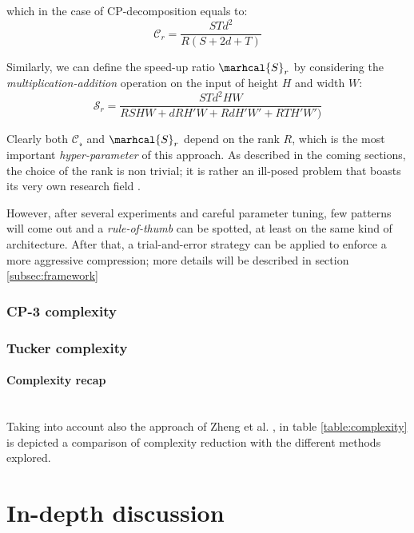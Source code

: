 which in the case of CP-decomposition equals to: 
\begin{equation}
    \mathcal{C}_r = \frac{STd^2}{R(S+2d+T)}    
\end{equation}

Similarly, we can define the speed-up ratio $\marhcal{S}_r$ by considering the \emph{multiplication-addition} operation on the input of height $H$ and width $W$: 
\begin{equation}
    \mathcal{S}_r = \frac{STd^2HW}{RSHW + dRH'W + RdH'W'+ RTH'W')}    
\end{equation}


Clearly both $\mathcal{C_r}$ and $\marhcal{S}_r$ depend on the rank $R$, which is the most important \emph{hyper-parameter} of this approach. As described in the coming sections, the choice of the rank is non trivial; it is rather an ill-posed problem that boasts its very own research field \parencite{rank-hard1}. 

However, after several experiments and careful parameter tuning, few patterns will come out and a \emph{rule-of-thumb} can be spotted, at least on the same kind of architecture. After that, a trial-and-error strategy can be applied to enforce a more aggressive compression; more details will be described in section \ref{subsec:framework}

\subsubsection{CP-3 complexity}


\subsubsection{Tucker complexity} 

\paragraph{Complexity recap}\\
Taking into account also the approach of Zheng et al. \parencite{zhang2015SVD}, in table \ref{table:complexity} is depicted a comparison of complexity reduction with the different methods explored. 



\section{In-depth discussion}

